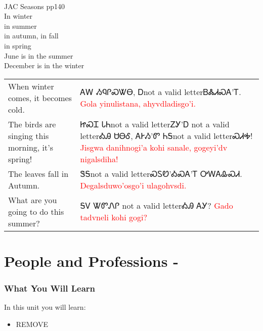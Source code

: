 \cite{walcpp49}\\
\noindent JAC Seasons pp140\\
In winter\\
in summer\\
in autumn, in fall\\
in spring\\
June is in the summer\\
December is in the winter\\
\begin{minipage}{\linewidth}
\begin{tabular}{p{3cm} p{11cm}}
When winter comes, it becomes cold. & ᎪᎳ ᏱᏄᎵᏍᏔᎾ, Ꭰnot a valid letterᏴᏜᏗᏍᎪ’Ꭲ. 
 \newline \textcolor{red}{Gola yinulistana, ahyvdladisgo’i.}\\
The birds are singing this morning, it’s spring! & ᏥᏍᏆ ᏓᏂnot a valid letterᏃᎩ’Ꭰ not a valid letterᎣᎯ ᏌᎾᎴ, ᎪᎨᏱ’Ꮫ ᏂᎦnot a valid letterᏍᏗᎭ! 
 \newline \textcolor{red}{Jisgwa danihnogi’a kohi sanale, gogeyi’dv nigalsdiha!}\\
The leaves fall in Autumn. & ᏕᎦnot a valid letterᏍᏚᏬ’ᎣᏍᎪ’Ꭲ ᎤᎳᎪᎲᏍᏗ. 
 \newline \textcolor{red}{Degalsduwo’osgo’i ulagohvsdi.}\\
What are you going to do this summer? & ᎦᏙ ᏔᏛᏁᎵ not a valid letterᎣᎯ ᎪᎩ? 
 \newline \textcolor{red}{Gado tadvneli kohi gogi?}\\
\end{tabular}
\end{minipage}

\cite{walcpp49}
\index{}
\chapter{People and Professions - }
\subsection{What You Will Learn}
In this unit you will learn:
\begin{itemize}
\item REMOVE
\end{itemize}\newpage

